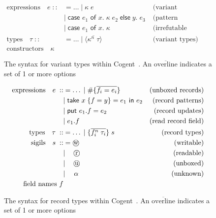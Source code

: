 \begin{figure}
    \centering

    \begin{align*}
        \text{expressions}\quad e\; 
            ::&= \dots\; |\; \kappa\; e & \text{(variant constructor)} \\
              &|\; \textsf{case } e_1 \textsf{ of } x.\; \kappa\; e_2\;
                   \textsf{else}\; y.\; e_3 \; & \text{(pattern matching)} \\
              &|\; \textsf{case } e_1 \textsf{ of } x.\; \kappa\; 
                   & \text{(irrefutable match)} \\
        \text{types}\quad \tau\;
            ::&= \dots\; |\; \langle \overline{\kappa^n\; \tau} \rangle & \text{(variant types)} \\
        \text{constructors}\quad \kappa
    \end{align*}

    \caption{The syntax for variant types within Cogent~\citep{LiamThesis}. An $\overline{\text{overline}}$ indicates a set of 1 or more options}
    \label{fig:variantGrammar}
\end{figure}

\begin{figure}
    \centering
    \begin{align*}
        \text{expressions}\quad e\; 
            ::&= \dots\; |\; \#\{\overline{f_i = e_i}\} & \text{(unboxed records)} \\
              &|\; \textsf{take } x\; \{ f = y\} = e_1 \textsf{ in } e_2 & \text{(record patterns)} \\
              &|\; \textsf{put } e_1.f = e_2 & \text{(record updates)} \\
              &|\; e_1.f & \text{(read record field)} \\
        \text{types}\quad \tau\;
            ::&= \dots\; |\; \{ \overline{f_i^n\; \tau_i} \}\; s & \text{(record types)} \\
        \text{sigils}\quad s\;
            ::&= \text{\textcircled{w}} & \text{(writable)} \\
            &|\quad\, \text{\textcircled{r}} & \text{(readable)}\\
            &|\quad\, \text{\textcircled{u}} & \text{(unboxed)}\\
            &|\quad\; \alpha & \text{(unknown)}\\
        \text{field names } f
    \end{align*}
    \caption{The syntax for record types within Cogent~\citep{ICFPCogent}. An $\overline{\text{overline}}$ indicates a set of 1 or more options}
    \label{fig:recordGrammar}
\end{figure}

